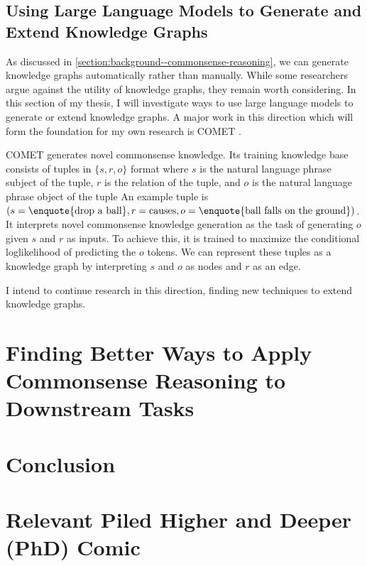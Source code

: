 \documentclass[12pt]{report}
\begin{document}
\section{Using Large Language Models to Generate and Extend Knowledge Graphs}

As discussed in \cref{section:background--commonsense-reasoning}, we can generate knowledge graphs automatically rather than manually.
While some researchers argue against the utility of knowledge graphs, they remain worth considering.
In this section of my thesis, I will investigate ways to use large language models to generate or extend knowledge graphs.
A major work in this direction which will form the foundation for my own research is COMET \cite{Bosselut2019-he}.

COMET generates novel commonsense knowledge.
Its training knowledge base consists of tuples in $\{s, r, o\}$ format where $s$ is the natural language phrase subject of the tuple, $r$ is the relation of the tuple, and $o$ is the natural language phrase object of the tuple
An example tuple is $(s=\text{\enquote{drop a ball}}, r=\text{causes}, o=\text{\enquote{ball falls on the ground}})$.
It interprets novel commonsense knowledge generation as the task of generating $o$ given $s$ and $r$ as inputs.
To achieve this, it is trained to maximize the conditional loglikelihood of predicting the $o$ tokens.
We can represent these tuples as a knowledge graph by interpreting $s$ and $o$ as nodes and $r$ as an edge.

I intend to continue research in this direction, finding new techniques to extend knowledge graphs.


\chapter{Finding Better Ways to Apply Commonsense Reasoning to Downstream Tasks}
\label{chapter:downstream-tasks}

\chapter{Conclusion}

\begin{footnotesize}
    
    
\end{footnotesize}

\appendix

\chapter{Relevant Piled Higher and Deeper (PhD) Comic}
\end{document}
